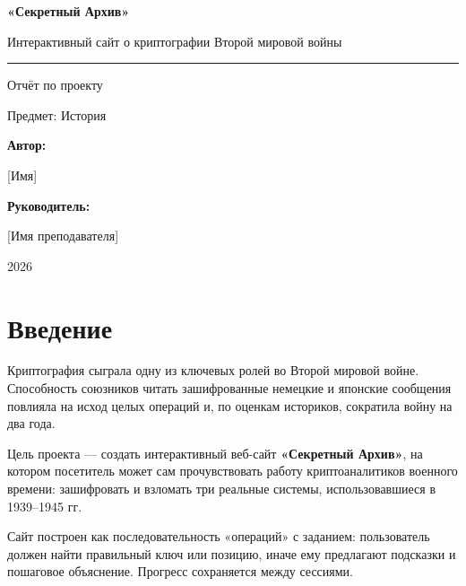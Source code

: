\documentclass[12pt, a4paper]{article}
\begin{document}
\begin{titlepage}
  \centering
  \vspace*{2cm}
  {\Huge\bfseries\color{darkred} «Секретный Архив»\par}
  \vspace{0.5cm}
  {\Large Интерактивный сайт о криптографии Второй мировой войны\par}
  \vspace{1.5cm}
  \rule{0.6\textwidth}{0.8pt}\par
  \vspace{1.5cm}
  {\large Отчёт по проекту\par}
  \vspace{0.5cm}
  {\normalsize Предмет: История\par}
  \vspace{2cm}
  {\large\bfseries Автор:} \hspace{0.3cm} {\large [Имя]\par}
  \vspace{0.4cm}
  {\large\bfseries Руководитель:} \hspace{0.3cm} {\large [Имя преподавателя]\par}
  \vspace{2cm}
  {\normalsize 2026\par}
\end{titlepage}

\tableofcontents
\newpage

\section{Введение}

Криптография сыграла одну из ключевых ролей во Второй мировой войне. Способность
союзников читать зашифрованные немецкие и японские сообщения повлияла на исход
целых операций и, по оценкам историков, сократила войну на два года.

Цель проекта --- создать интерактивный веб-сайт \textbf{«Секретный Архив»}, на
котором посетитель может сам прочувствовать работу криптоаналитиков военного
времени: зашифровать и взломать три реальные системы, использовавшиеся в 1939--1945 гг.

Сайт построен как последовательность «операций» с заданием: пользователь должен
найти правильный ключ или позицию, иначе ему предлагают подсказки и пошаговое
объяснение. Прогресс сохраняется между сессиями.
\end{document}
